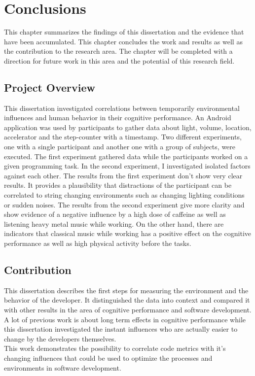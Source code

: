 \chapter{Conclusions}
This chapter summarizes the findings of this dissertation and the evidence that have been accumulated. This chapter concludes the work and results as well as the contribution to the research area. 
The chapter will be completed with a direction for future work in this area and the potential of this research field. 

\section{Project Overview}
This dissertation investigated correlations between temporarily environmental influences and human behavior in their cognitive performance. 
An Android application was used by participants to gather data about light, volume, location, accelerator and the step-counter with a timestamp.  
Two different experiments, one with a single participant and another one with a group of subjects, were executed. The first experiment gathered data while the participants worked on a given programming task. In the second experiment, I investigated isolated factors against each other.
The results from the first experiment don't show very clear results. It provides a plausibility that distractions of the participant can be correlated to string changing environments such as changing lighting conditions or sudden noises. 
The results from the second experiment give more clarity and show evidence of a negative influence by a high dose of caffeine as well as listening heavy metal music while working. On the other hand, there are indicators that classical music while working has a positive effect on the cognitive performance  as well as high physical activity before the tasks. 

\section{Contribution}
This dissertation describes the first steps for measuring the environment and the behavior of the developer. It distinguished the data into context and compared it with other results in the area of cognitive performance and software development. A lot of previous work is about long term effects in cognitive performance while this dissertation investigated the instant influences who are actually easier to change by the developers themselves. \\
This work demonstrates the possibility to correlate code metrics with it's changing influences that could be used to optimize the processes and environments in software development. 

